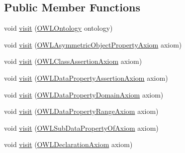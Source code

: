 \subsection*{Public Member Functions}
\begin{DoxyCompactItemize}
\item 
void \hyperlink{classorg_1_1semanticweb_1_1owlapi_1_1util_1_1_hash_code_a15e94197fe793a9cc55aaa188df7345a}{visit} (\hyperlink{interfaceorg_1_1semanticweb_1_1owlapi_1_1model_1_1_o_w_l_ontology}{O\-W\-L\-Ontology} ontology)
\item 
void \hyperlink{classorg_1_1semanticweb_1_1owlapi_1_1util_1_1_hash_code_a23e63697f2a99c0d0cd91acf79eaf722}{visit} (\hyperlink{interfaceorg_1_1semanticweb_1_1owlapi_1_1model_1_1_o_w_l_asymmetric_object_property_axiom}{O\-W\-L\-Asymmetric\-Object\-Property\-Axiom} axiom)
\item 
void \hyperlink{classorg_1_1semanticweb_1_1owlapi_1_1util_1_1_hash_code_a999f7429f1127f9dc6dda7cc2d89674f}{visit} (\hyperlink{interfaceorg_1_1semanticweb_1_1owlapi_1_1model_1_1_o_w_l_class_assertion_axiom}{O\-W\-L\-Class\-Assertion\-Axiom} axiom)
\item 
void \hyperlink{classorg_1_1semanticweb_1_1owlapi_1_1util_1_1_hash_code_a446f5ea0d49a5fbffb1ca89c82bbe276}{visit} (\hyperlink{interfaceorg_1_1semanticweb_1_1owlapi_1_1model_1_1_o_w_l_data_property_assertion_axiom}{O\-W\-L\-Data\-Property\-Assertion\-Axiom} axiom)
\item 
void \hyperlink{classorg_1_1semanticweb_1_1owlapi_1_1util_1_1_hash_code_ade1547f347a5a031496d5a4a595cbaeb}{visit} (\hyperlink{interfaceorg_1_1semanticweb_1_1owlapi_1_1model_1_1_o_w_l_data_property_domain_axiom}{O\-W\-L\-Data\-Property\-Domain\-Axiom} axiom)
\item 
void \hyperlink{classorg_1_1semanticweb_1_1owlapi_1_1util_1_1_hash_code_a2dfb353121c4c1806ee8f11f477c61ce}{visit} (\hyperlink{interfaceorg_1_1semanticweb_1_1owlapi_1_1model_1_1_o_w_l_data_property_range_axiom}{O\-W\-L\-Data\-Property\-Range\-Axiom} axiom)
\item 
void \hyperlink{classorg_1_1semanticweb_1_1owlapi_1_1util_1_1_hash_code_a3aea315060a7cd534c4ab8216cd545ab}{visit} (\hyperlink{interfaceorg_1_1semanticweb_1_1owlapi_1_1model_1_1_o_w_l_sub_data_property_of_axiom}{O\-W\-L\-Sub\-Data\-Property\-Of\-Axiom} axiom)
\item 
void \hyperlink{classorg_1_1semanticweb_1_1owlapi_1_1util_1_1_hash_code_a38770ca40d2b18a7dcdec1add0a4cab8}{visit} (\hyperlink{interfaceorg_1_1semanticweb_1_1owlapi_1_1model_1_1_o_w_l_declaration_axiom}{O\-W\-L\-Declaration\-Axiom} axiom)

\end{DoxyCompactItemize}
